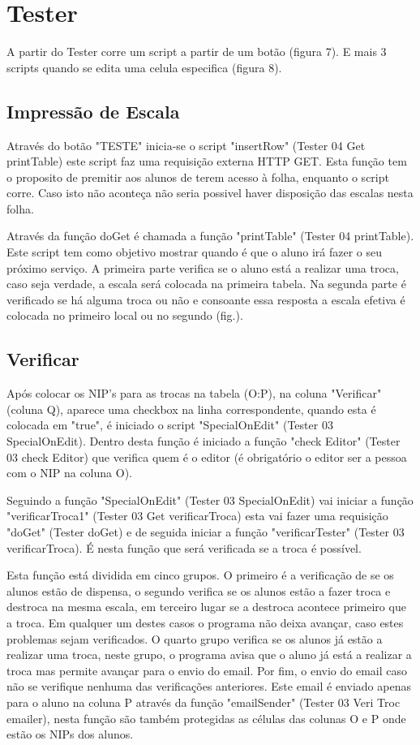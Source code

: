 \graphicspath{{Images/}}

\section{Tester}

A partir do Tester corre um script a partir de um botão (figura 7). E mais 3 scripts quando se edita uma celula especifica (figura 8).
\subsection{Impressão de Escala}
Através do botão "TESTE" inicia-se o script "insertRow" (Tester 04 Get printTable) este script faz uma requisição externa HTTP GET. Esta função tem o proposito de premitir aos alunos de terem acesso à folha, enquanto o script corre. Caso isto não aconteça não seria possivel haver disposição das escalas nesta folha.

Através da função doGet é chamada a função "printTable" (Tester 04 printTable). Este script tem como objetivo mostrar quando é que o aluno irá fazer o seu próximo serviço. A primeira parte verifica se o aluno está a realizar uma troca, caso seja verdade, a escala será colocada na primeira tabela. Na segunda parte é verificado se há alguma troca ou não e consoante essa resposta a escala efetiva é colocada no primeiro local ou no segundo (fig.).

\subsection{Verificar}
Após colocar os NIP's para as trocas na tabela (O:P), na coluna "Verificar" (coluna Q), aparece uma checkbox na linha correspondente, quando esta é colocada em "true", é iniciado o script "SpecialOnEdit" (Tester 03 SpecialOnEdit). Dentro desta função é iniciado a função "check Editor" (Tester 03 check Editor) que verifica quem é o editor (é obrigatório o editor ser a pessoa com o NIP na coluna O).

Seguindo a função "SpecialOnEdit" (Tester 03 SpecialOnEdit) vai iniciar a função "verificarTroca1" (Tester 03 Get verificarTroca) esta vai fazer uma requisição "doGet" (Tester doGet) e de seguida iniciar a função "verificarTester" (Tester 03 verificarTroca). É nesta função que será verificada se a troca é possível.

Esta função está dividida em cinco grupos. O primeiro é a verificação de se os alunos estão de dispensa, o segundo verifica se os alunos estão a fazer troca e destroca na mesma escala, em terceiro lugar se a destroca acontece primeiro que a troca. Em qualquer um destes casos o programa não deixa avançar, caso estes problemas sejam verificados. O quarto grupo verifica se os alunos já estão a realizar uma troca, neste grupo, o programa avisa que o aluno já está a realizar a troca mas permite avançar para o envio do email. Por fim, o envio do email caso não se verifique nenhuma das verificações anteriores. Este email é enviado apenas para o aluno na coluna P através da função "emailSender" (Tester 03 Veri Troc emailer), nesta função são também protegidas as células das colunas O e P onde estão os NIPs dos alunos.

